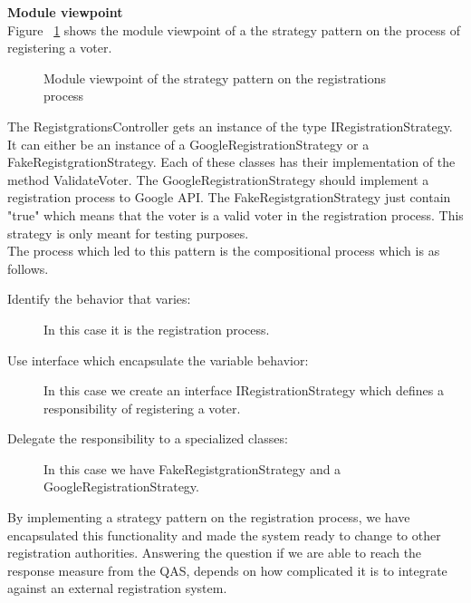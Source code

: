 \noindent
\textbf{Module viewpoint}\\
Figure ~\ref{fig:the_registrations_process} shows the module viewpoint of a the strategy pattern on the process of registering a voter.


\begin{figure}[H]
\centering
  \caption{Module viewpoint of the strategy pattern on the registrations process} 
   \label{fig:the_registrations_process}
\end{figure}
\noindent
The RegistgrationsController gets an instance of the type IRegistrationStrategy. It can either be an instance of a GoogleRegistrationStrategy or a FakeRegistgrationStrategy. Each of these classes has their implementation of the method ValidateVoter. The GoogleRegistrationStrategy should implement a registration process to Google API. The FakeRegistgrationStrategy just contain "true" which means that the voter is a valid voter in the registration process. This strategy is only meant for testing purposes. \\ 


\noindent
The process which led to this pattern is the compositional process which is as follows.


\begin{description}
    \item[Identify the behavior that varies:] In this case it is the registration process.  

    \item[Use interface which encapsulate the variable behavior:]  In this case we create an interface IRegistrationStrategy which defines a  responsibility of registering a voter.     
    
    \item[Delegate the responsibility to a specialized classes:] In this case we have FakeRegistgrationStrategy and a GoogleRegistrationStrategy.
\end{description}

\noindent
By implementing a strategy pattern on the registration process, we have encapsulated this functionality and made the system ready to change to other registration authorities. Answering the question if we are able to reach the response measure from the QAS, depends on how complicated it is to integrate against an external registration system. 




